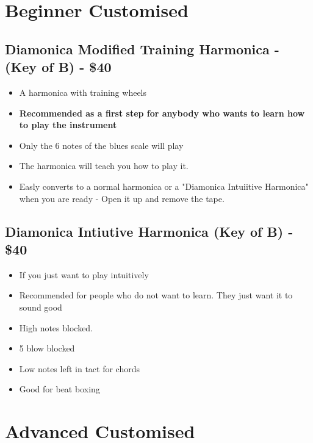     \section*{Beginner Customised}
       \subsection*{Diamonica Modified Training Harmonica - (Key of B)  - \$40}
            \begin{itemize}
                \item A harmonica with training wheels
                \item \textbf{Recommended as a first step for anybody who wants to learn how to play the instrument}
                \item Only the 6 notes of the blues scale will play 
                \item The harmonica will teach you how to play it.
                \item Easly converts to a normal harmonica or a "Diamonica Intuiitive Harmonica" when you are ready - Open it up and remove the tape.
            \end{itemize}


        \subsection*{Diamonica Intiutive Harmonica (Key of B) - \$40}
            \begin{itemize}
                \item If you just want to play intuitively 
                \item Recommended for people who do not want to learn. They just want it to sound good
                \item High notes blocked. 
                \item 5 blow blocked 
                \item Low notes left in tact for chords
                \item Good for beat boxing
            \end{itemize}
            
   
    \section*{Advanced Customised}        
